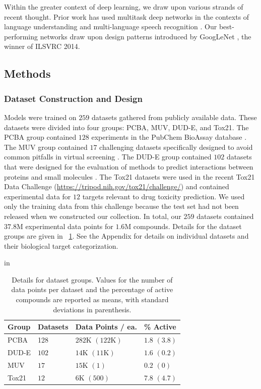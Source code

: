 Within the greater context of deep learning, we draw upon various strands
of recent thought. Prior work has used multitask deep networks in the
contexts of language understanding \cite{collobert2008unified} and
multi-language speech recognition \cite{deng2013new}. Our best-performing
networks draw upon design patterns introduced by GoogLeNet
\cite{szegedy2014going}, the winner of ILSVRC 2014.

\subsection{Methods}

\subsubsection{Dataset Construction and Design}
\label{sec:datasets}
Models were trained on $259$ datasets gathered from publicly available
data.  These datasets were divided into four groups: PCBA, MUV, DUD-E, and
Tox21.  The PCBA group contained $128$ experiments in the PubChem BioAssay
database \cite{wang2012pubchem}.  The MUV group contained $17$ challenging
datasets specifically designed to avoid common pitfalls in virtual
screening \cite{rohrer2009maximum}. The DUD-E group contained $102$
datasets that were designed for the evaluation of methods to predict
interactions between proteins and small molecules
\cite{mysinger2012directory}.  The Tox21 datasets were used in the recent
Tox21 Data Challenge (\url{https://tripod.nih.gov/tox21/challenge/}) and
contained experimental data for $12$ targets relevant to drug toxicity
prediction. We used only the training data from this challenge because the
test set had not been released when we constructed our collection.  In
total, our $259$ datasets contained $37.8$M experimental data points for
$1.6$M compounds. Details for the dataset groups are given in
\tablename~\ref{tab:datasets}. See the Appendix for details on individual
datasets and their biological target categorization.

\begin{table}
\small
\centering
\caption{Details for dataset groups. Values for the number of data points
per dataset and the percentage of active compounds are reported as means,
with standard deviations in parenthesis.}
 in
\label{tab:datasets}
\begin{tabular}{llll}
\toprule
{Group} & {Datasets} & {Data Points / ea.} & {\% Active} \\
\midrule
{PCBA} & 128 & $282\text{K}$ $(122\text{K})$ & $1.8$ $(3.8)$ \\
DUD-E & $102$ & $14\text{K}$ $(11\text{K})$ & $1.6$ $(0.2)$ \\
MUV & $17$ & $15\text{K}$ $(1)$ & $0.2$ $(0)$ \\
Tox21 & $12$ & $6\text{K}$ $(500)$ & $7.8$ $(4.7)$ \\
\bottomrule
\end{tabular}
\vskip -0.2in
\end{table}

